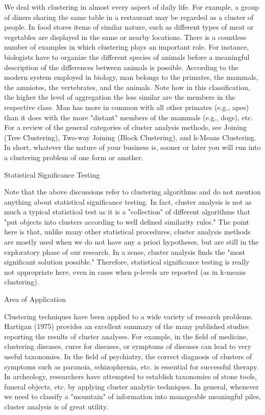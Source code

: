 We deal with clustering in almost every aspect of daily life. For example, a group of diners sharing the same table in a restaurant may be regarded as a cluster of people. In food stores items of similar nature, such as different types of meat or vegetables are displayed in the same or nearby locations. There is a countless number of examples in which clustering plays an important role. For instance, biologists have to organize the different species of animals before a meaningful description of the differences between animals is possible. According to the modern system employed in biology, man belongs to the primates, the mammals, the amniotes, the vertebrates, and the animals. Note how in this classification, the higher the level of aggregation the less similar are the members in the respective class. Man has more in common with all other primates (e.g., apes) than it does with the more "distant" members of the mammals (e.g., dogs), etc. For a review of the general categories of cluster analysis methods, see Joining (Tree Clustering), Two-way Joining (Block Clustering), and k-Means Clustering. In short, whatever the nature of your business is, sooner or later you will run into a clustering problem of one form or another.

Statistical Significance Testing

Note that the above discussions refer to clustering algorithms and do not mention anything about statistical significance testing. In fact, cluster analysis is not as much a typical statistical test as it is a "collection" of different algorithms that "put objects into clusters according to well defined similarity rules." The point here is that, unlike many other statistical procedures, cluster analysis methods are mostly used when we do not have any a priori hypotheses, but are still in the exploratory phase of our research. In a sense, cluster analysis finds the "most significant solution possible." Therefore, statistical significance testing is really not appropriate here, even in cases when p-levels are reported (as in k-means clustering).

Area of Application

Clustering techniques have been applied to a wide variety of research problems. Hartigan (1975) provides an excellent summary of the many published studies reporting the results of cluster analyses. For example, in the field of medicine, clustering diseases, cures for diseases, or symptoms of diseases can lead to very useful taxonomies. In the field of psychiatry, the correct diagnosis of clusters of symptoms such as paranoia, schizophrenia, etc. is essential for successful therapy. In archeology, researchers have attempted to establish taxonomies of stone tools, funeral objects, etc. by applying cluster analytic techniques. In general, whenever we need to classify a "mountain" of information into manageable meaningful piles, cluster analysis is of great utility.

